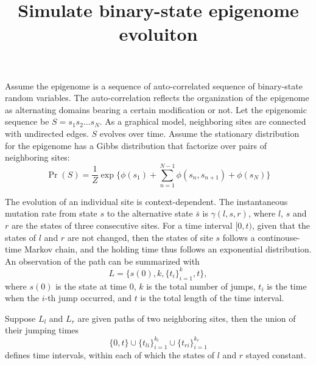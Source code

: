 \documentclass[11pt]{article}
\title{Simulate binary-state epigenome evoluiton}
\begin{document}
\maketitle

Assume the epigenome is a sequence of auto-correlated sequence of
binary-state random variables. The auto-correlation reflects the
organization of the epigenome as alternating domains bearing a certain
modification or not. Let the epigenomic sequence be $S=s_1s_2\ldots
s_N$. As a graphical model, neighboring sites are connected with
undirected edges. $S$ evolves over time. Assume the stationary
distribution for the epigenome has a Gibbs distribution that factorize
over pairs of neighboring sites:
\begin{equation}\label{eqn:stationary}
\Pr(S) = \frac{1}{Z} \exp\big\{\phi(s_1) +\sum_{n=1}^{N-1}\phi(s_n, s_{n+1}) + \phi(s_N)\big\}
\end{equation}

The evolution of an individual site is context-dependent. The
instantaneous mutation rate from state $s$ to the alternative
state $\bar{s}$ is $\gamma(l, s, r)$, where $l$, $s$ and $r$
are the states of three consecutive sites.  For a time interval $[0,t)$,
given that the states of $l$ and $r$ are not changed, then
the states of site $s$ follows a continouse-time Markov chain, 
and the holding time thus follows an exponential distribution.
An observation of the path can be summarized with
\[
  L = \big\{s(0), k, \{t_i\}_{i=1}^{k}, t \big\},
\]
where $s(0)$ is the state at time 0, $k$ is the total number of jumps,
$t_i$ is the time when the $i$-th jump occurred, and $t$ is the total
length of the time interval.

Suppose $L_l$ and $L_r$ are given paths of two neighboring sites, then
the union of their jumping times
\[
  \{0, t\} \cup \{t_{li}\}_{i=1}^{k_l} \cup \{t_{ri}\}_{i=1}^{k_r} 
\] defines time intervals, within each of which
the states of $l$ and $r$ stayed constant.
\end{document}
